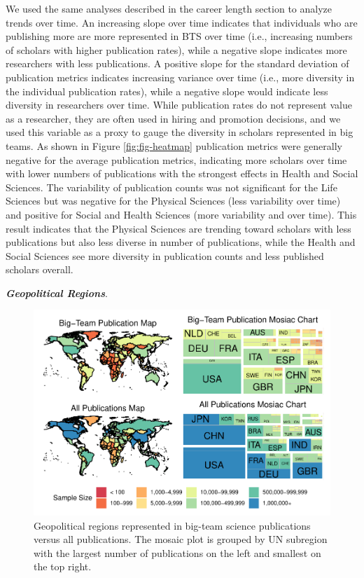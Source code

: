 \documentclass[
  man,floatsintext]{apa6}
\begin{document}
We used the same analyses described in the career length section to
analyze trends over time. An increasing slope over time indicates that
individuals who are publishing more are more represented in BTS over
time (i.e., increasing numbers of scholars with higher publication
rates), while a negative slope indicates more researchers with less
publications. A positive slope for the standard deviation of publication
metrics indicates increasing variance over time (i.e., more diversity in
the individual publication rates), while a negative slope would indicate
less diversity in researchers over time. While publication rates do not
represent value as a researcher, they are often used in hiring and
promotion decisions, and we used this variable as a proxy to gauge the
diversity in scholars represented in big teams. As shown in Figure
\ref{fig:fig-heatmap} publication metrics were generally negative for
the average publication metrics, indicating more scholars over time with
lower numbers of publications with the strongest effects in Health and
Social Sciences. The variability of publication counts was not
significant for the Life Sciences but was negative for the Physical
Sciences (less variability over time) and positive for Social and Health
Sciences (more variability and over time). This result indicates that
the Physical Sciences are trending toward scholars with less
publications but also less diverse in number of publications, while the
Health and Social Sciences see more diversity in publication counts and
less published scholars overall.

\textbf{\emph{Geopolitical Regions}}.

\begin{figure}
\centering
\includegraphics{manuscript_scopus_files/figure-latex/fig-map-both-1.pdf}
\caption{\label{fig:fig-map-both}Geopolitical regions represented in big-team science publications versus all publications. The mosaic plot is grouped by UN subregion with the largest number of publications on the left and smallest on the top right.}
\end{figure}
\end{document}

